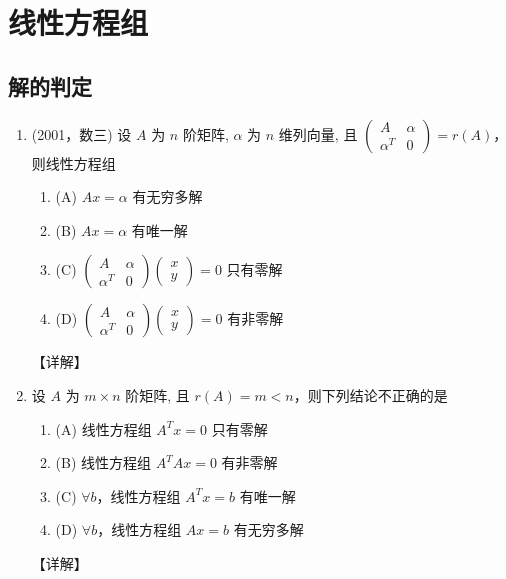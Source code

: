 \documentclass[12pt, a4paper, oneside, UTF8]{ctexbook}
\begin{document}
\section{线性方程组}

\subsection{解的判定}

\begin{enumerate}[label=\arabic*.]
    \item (2001，数三) 设 $A$ 为 $n$ 阶矩阵, $\alpha$ 为 $n$ 维列向量, 且 $\begin{pmatrix} A & \alpha \\ \alpha^T & 0 \end{pmatrix} = r(A)$，则线性方程组
    \begin{enumerate}
        \item (A) $Ax = \alpha$ 有无穷多解
        \item (B) $Ax = \alpha$ 有唯一解
        \item (C) $\begin{pmatrix} A & \alpha \\ \alpha^T & 0 \end{pmatrix} \begin{pmatrix} x \\ y \end{pmatrix} = 0$ 只有零解
        \item (D) $\begin{pmatrix} A & \alpha \\ \alpha^T & 0 \end{pmatrix} \begin{pmatrix} x \\ y \end{pmatrix} = 0$ 有非零解
    \end{enumerate}
    
    \begin{solution}
    【详解】
    \end{solution}
    
    \item 设 $A$ 为 $m \times n$ 阶矩阵, 且 $r(A) = m < n$，则下列结论不正确的是
    \begin{enumerate}
        \item (A) 线性方程组 $A^T x = 0$ 只有零解
        \item (B) 线性方程组 $A^T A x = 0$ 有非零解
        \item (C) $\forall b$，线性方程组 $A^T x = b$ 有唯一解
        \item (D) $\forall b$，线性方程组 $A x = b$ 有无穷多解
    \end{enumerate}
    
    \begin{solution}
    【详解】
    \end{solution}
\end{enumerate}
\end{document}
